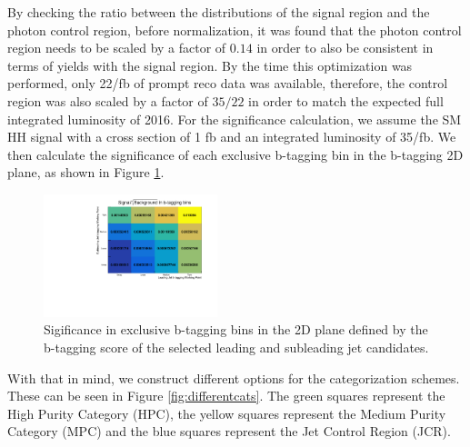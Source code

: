 By checking the ratio between the distributions of the signal region and the photon control region, before normalization, it was found that the photon control region 
needs to be scaled by a factor of $0.14$ in order to also be consistent in terms of yields with the signal region. 
By the time this optimization was performed, only 22/fb of prompt reco data was available, therefore, the control region was also scaled by a factor of $35/22$ in order to match 
the expected full integrated luminosity of 2016. 
For the significance calculation, we assume the SM HH signal with a cross section of 1 fb and an integrated luminosity of 35/fb. 
We then calculate the significance of each exclusive b-tagging bin in the b-tagging 2D plane, as shown in Figure \ref{fig:2D_sig_btag}. 

\begin{figure}[thb]
  \centering
  \includegraphics[width=0.45\textwidth]{figures/sec-cats/2DbtagSig}\hfil
  \caption{Sigificance in exclusive b-tagging bins in the 2D plane defined by the b-tagging score of the selected leading and subleading jet candidates.}
  \label{fig:2D_sig_btag}
\end{figure}

With that in mind, we construct different options for the categorization schemes. These can be seen in Figure \ref{fig:differentcats}. 
The green squares represent the High Purity Category (HPC), the yellow squares represent the Medium Purity Category (MPC) and the blue squares represent 
the Jet Control Region (JCR). 

